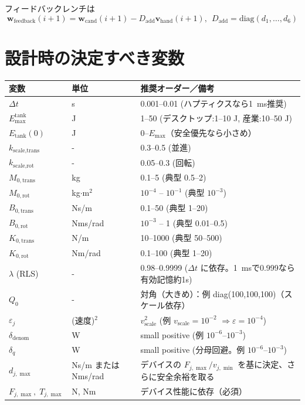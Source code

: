 \documentclass[uplatex]{jsarticle}
\begin{document}
フィードバックレンチは
\begin{equation}
  \bm{w}_{\text{feedback}}(i+1) = \bm{w}_{\text{cand}}(i+1) - D_{\text{add}} \bm{v}_{\text{hand}}(i+1), ~~ D_{\text{add}} = \text{diag}(d_1, \ldots, d_6)
\end{equation}


\section{設計時の決定すべき変数}

\begin{table}[h]
  \centering
  \begin{tabular}{l l l}
  \toprule
  変数 & 単位 & 推奨オーダー／備考 \\
  \midrule
  $\Delta t$ & s & 0.001--0.01 (ハプティクスなら1~\si{ms}推奨) \\
  $E_{\max}^{\text{tank}}$ & J & 1--50 (デスクトップ:1--10 \si{J}, 産業:10--50 \si{J}) \\
  $E_{\text{tank}}(0)$ & J & 0--$E_{\max}$（安全優先なら小さめ） \\
  $k_{\text{scale,trans}}$ & - & 0.3--0.5 (並進) \\
  $k_{\text{scale,rot}}$ & - & 0.05--0.3 (回転) \\
  $M_{0,\text{trans}}$ & kg & 0.1--5 (典型 0.5--2) \\
  $M_{0,\text{rot}}$ & kg$\cdot$m$^2$ & $10^{-4}$ -- $10^{-1}$ (典型 $10^{-3}$) \\
  $B_{0,\text{trans}}$ & Ns/m & 0.1--50 (典型 1--20) \\
  $B_{0,\text{rot}}$ & Nms/rad & $10^{-3}$ -- 1 (典型 0.01--0.5) \\
  $K_{0,\text{trans}}$ & N/m & 10--1000 (典型 50--500) \\
  $K_{0,\text{rot}}$ & Nm/rad & 0.1--100 (典型 1--20) \\
  $\lambda$ (RLS) & - & 0.98--0.9999 ($\Delta t$ に依存。1~\si{ms}で0.999なら有効記憶約1s) \\
  $Q_0$ & - & 対角（大きめ）：例 diag(100,100,100)（スケール依存） \\
  $\varepsilon_j$ & (速度)$^2$ & $v_{\text{scale}}^2$ (例 $v_{\text{scale}}=10^{-2}$ $\Rightarrow \varepsilon=10^{-4}$) \\
  $\delta_{\text{denom}}$ & W & small positive (例 $10^{-6}$--$10^{-3}$) \\
  $\delta_q$ & W & small positive (分母回避。例 $10^{-6}$--$10^{-3}$) \\
  $d_{j,\max}$ & Ns/m または Nms/rad & デバイスの $F_{j,\max}/v_{j,\min}$ を基に決定、さらに安全余裕を取る \\
  $F_{j,\max},\;T_{j,\max}$ & N, Nm & デバイス性能に依存（必須） \\
  \bottomrule
  \end{tabular}
\end{table}
\end{document}
